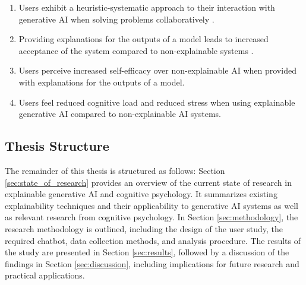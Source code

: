 \begin{enumerate}[label=(\textbf{H{\arabic*}}),leftmargin=4em]
    \item Users exhibit a heuristic-systematic approach to their interaction with generative \ac{AI} when solving problems collaboratively \parencite{Jussupow2021}.
    \item Providing explanations for the outputs of a model leads to increased acceptance of the system compared to non-explainable systems \parencite{Li2022}.
    \item Users perceive increased self-efficacy over non-explainable \ac{AI} when provided with explanations for the outputs of a model.
    \item Users feel reduced cognitive load and reduced stress when using explainable generative \ac{AI} compared to non-explainable \ac{AI} systems.
\end{enumerate}


\subsection{Thesis Structure} \label{subsec:thesis-structure}

The remainder of this thesis is structured as follows: Section \ref{sec:state_of_research} provides an overview of the current state of research in explainable generative \ac{AI} and cognitive psychology. It summarizes existing explainability techniques and their applicability to generative \ac{AI} systems as well as relevant research from cognitive psychology. In Section \ref{sec:methodology}, the research methodology is outlined, including the design of the user study, the required chatbot, data collection methods, and analysis procedure. The results of the study are presented in Section \ref{sec:results}, followed by a discussion of the findings in Section \ref{sec:discussion}, including implications for future research and practical applications.

